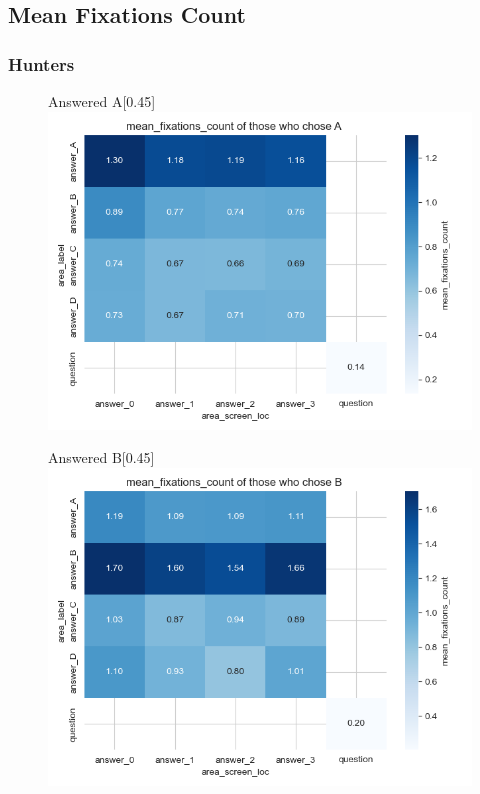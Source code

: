 \documentclass{article}
\begin{document}
\subsection{Mean Fixations Count}
\subsubsection{Hunters}

\begin{figure}[H]
  \centering
  \begin{subcaptionbox}{Answered A\label{fig:A_fc_h}}[0.45\textwidth]
    {\centering\includegraphics[width=\linewidth]{plots/matrix_plots/matrix_mean_fixations_count_A_hunters.png}}
  \end{subcaptionbox}
  \hfill
  \begin{subcaptionbox}{Answered B\label{fig:B_fc_h}}[0.45\textwidth]
    {\centering\includegraphics[width=\linewidth]{plots/matrix_plots/matrix_mean_fixations_count_B_hunters.png}}
  \end{subcaptionbox}
  

\end{figure}
\end{document}
